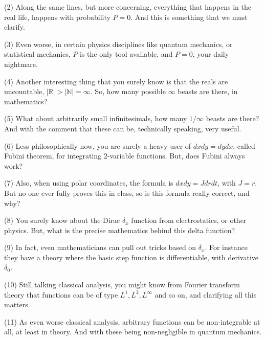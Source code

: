 \documentclass[12pt]{amsbook}
\begin{document}
\bigskip

(2) Along the same lines, but more concerning, everything that happens in the real life, happens with probability $P=0$. And this is something that we must clarify.

\bigskip

(3) Even worse, in certain physics disciplines like quantum mechanics, or statistical mechanics, $P$ is the only tool available, and $P=0$, your daily nightmare. 

\bigskip

(4) Another interesting thing that you surely know is that the reals are uncountable, $|\mathbb R|>|\mathbb N|=\infty$. So, how many possible $\infty$ beasts are there, in mathematics?

\bigskip

(5) What about arbitrarily small infinitesimals, how many $1/\infty$ beasts are there? And with the comment that these can be, technically speaking, very useful.

\bigskip

(6) Less philosophically now, you are surely a heavy user of $dxdy=dydx$, called Fubini theorem, for integrating 2-variable functions. But, does Fubini always work?

\bigskip

(7) Also, when using polar coordinates, the formula is $dxdy=Jdrdt$, with $J=r$. But no one ever fully proves this in class, so is this formula really correct, and why?

\bigskip

(8) You surely know about the Dirac $\delta_x$ function from electrostatics, or other physics. But, what is the precise mathematics behind this delta function?

\bigskip

(9) In fact, even mathematicians can pull out tricks based on $\delta_x$. For instance they have a theory where the basic step function is differentiable, with derivative $\delta_0$.

\bigskip

(10) Still talking classical analysis, you might know from Fourier transform theory that functions can be of type $L^1,L^2,L^\infty$ and so on, and clarifying all this matters.

\bigskip

(11) As even worse classical analysis, arbitrary functions can be non-integrable at all, at least in theory. And with these being non-negligible in quantum mechanics.
\end{document}
